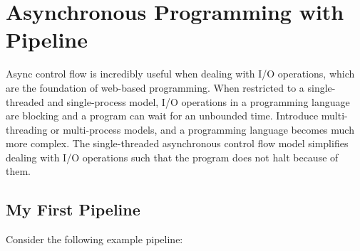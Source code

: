 \documentclass[./LRM_main.tex]{subfiles}
\begin{document}


\chapter{Asynchronous Programming with Pipeline}
Async control flow is incredibly useful when dealing with I/O operations, which are the foundation of web-based programming. When restricted to a single-threaded and single-process model, I/O operations in a programming language are blocking and a program can wait for an unbounded time. Introduce multi-threading or multi-process models, and a programming language becomes much more complex. The single-threaded asynchronous control flow model simplifies dealing with I/O operations such that the program does not halt because of them.


\section{My First Pipeline}
Consider the following example pipeline:
\end{document}
